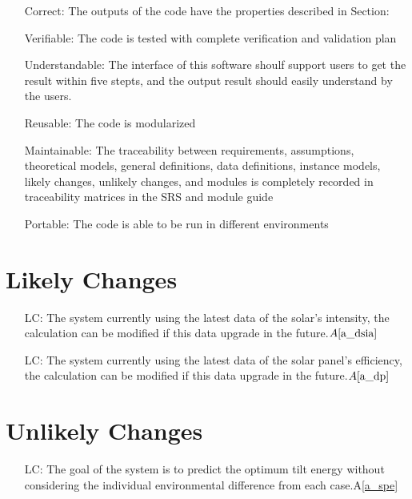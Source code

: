 \documentclass[12pt]{article}
\newcommand{\aref}[1]{A\ref{#1}}
\newcounter{lcnum} %
\begin{document}
\noindent\begin{itemize}
\item[ ]Correct: The outputs of the code have the properties described in Section: 
\item[ ]Verifiable: The code is tested with complete verification and validation plan
\item[ ]Understandable: The interface of this software shoulf support users to get the result within five
stepts, and the output result should easily understand by the users.
\item[ ]Reusable: The code is modularized
\item[ ]Maintainable: The traceability between requirements, assumptions, theoretical models, general definitions, data definitions, instance models, likely changes, unlikely changes, and modules
is completely recorded in traceability matrices in the SRS and module guide
\item[ ]Portable: The code is able to be run in different environments
\end{itemize}

\section{Likely Changes}    

\noindent \begin{itemize}

\item[LC\refstepcounter{lcnum}\thelcnum\label{LC_SI}:] The system currently using the latest data of the solar's intensity, the calculation can be modified if this data upgrade in the future.$\aref{a_dsia}$

\item[LC\refstepcounter{lcnum}\thelcnum\label{LC_P}:] The system currently using the latest data of the solar panel's efficiency, the calculation can be modified if this data upgrade in the future.$\aref{a_dp}$

\end{itemize}

\section{Unlikely Changes}    

\noindent \begin{itemize}

\item[LC\refstepcounter{lcnum}\thelcnum\label{LC_G}:] The goal of the system is to predict the optimum tilt energy without considering the individual environmental difference from each case.\aref{a_spe}

\end{itemize}
\end{document}
